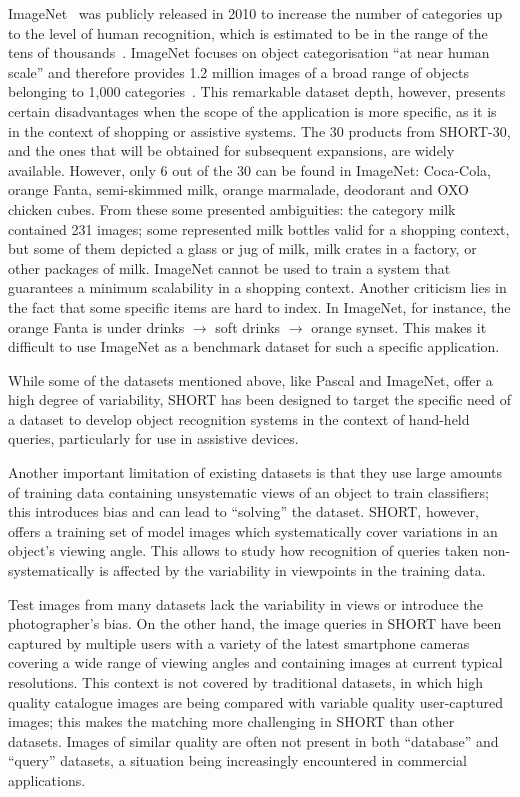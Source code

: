 ImageNet~\cite{Deng2009} was publicly released in 2010 to increase the number of categories up to the level of human recognition, which is estimated to be in the range of the tens of thousands~\cite{Biederman1987}. ImageNet focuses on object categorisation ``at near human scale'' and therefore provides 1.2 million images of a broad range of objects belonging to 1,000 categories~\cite{Feifei2007}. This remarkable dataset depth, however, presents certain disadvantages when the scope of the application is more specific, as it is in the context of shopping or assistive systems. The 30 products from SHORT-30, and the ones that will be obtained for subsequent expansions, are widely available. However, only 6 out of the 30 can be found in ImageNet: Coca-Cola, orange Fanta, semi-skimmed milk, orange marmalade, deodorant and OXO chicken cubes. From these some presented ambiguities: the category milk contained 231 images; some represented milk bottles valid for a shopping context, but some of them depicted a glass or jug of milk, milk crates in a factory, or other packages of milk. ImageNet cannot be used to train a system that guarantees a minimum scalability in a shopping context. Another criticism lies in the fact that some specific items are hard to index. In ImageNet, for instance, the orange Fanta is under drinks $\rightarrow$ soft drinks $\rightarrow$ orange synset. This makes it difficult to use ImageNet as a benchmark dataset for such a specific application.


While some of the datasets mentioned above, like Pascal and ImageNet, offer a high degree of variability, SHORT has been designed to target the specific need of a dataset to develop object recognition systems in the context of hand-held queries, particularly for use in assistive devices.

Another important limitation of existing datasets is that they use large amounts of training data containing unsystematic views of an object to train classifiers; this introduces bias and can lead to ``solving'' the dataset. SHORT, however, offers a training set of model images which systematically cover variations in an object's viewing angle. This allows to study how recognition of queries taken non-systematically is affected by the variability in viewpoints in the training data.

Test images from many datasets lack the variability in views or introduce the photographer's bias. On the other hand, the image queries in SHORT have been captured by multiple users with a variety of the latest smartphone cameras covering a wide range of viewing angles and containing images at current typical resolutions. This context is not covered by traditional datasets, in which high quality catalogue images are being compared with variable quality user-captured images; this makes the matching more challenging in SHORT than other datasets. Images of similar quality are often not present in both ``database'' and ``query'' datasets, a situation being increasingly encountered in commercial applications.

